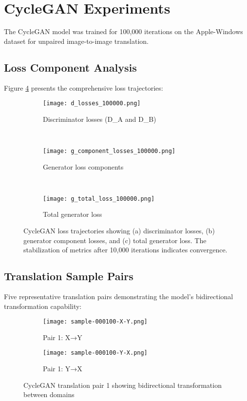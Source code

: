 \documentclass{article}
\begin{document}
\section{CycleGAN Experiments}
The CycleGAN model was trained for 100,000 iterations on the Apple-Windows dataset for unpaired image-to-image translation.

\subsection{Loss Component Analysis}
Figure \ref{fig:cyclegan_losses} presents the comprehensive loss trajectories:

\begin{figure}[H]
\centering
\begin{subfigure}{0.8\textwidth}
    \texttt{[image: d\_losses\_100000.png]}
    \caption{Discriminator losses (D\_A and D\_B)}
    \label{fig:cyclegan_d_loss}
\end{subfigure}
\\
\begin{subfigure}{0.8\textwidth}
    \texttt{[image: g\_component\_losses\_100000.png]}
    \caption{Generator loss components}
    \label{fig:cyclegan_g_components}
\end{subfigure}
\\
\begin{subfigure}{0.8\textwidth}
    \texttt{[image: g\_total\_loss\_100000.png]}
    \caption{Total generator loss}
    \label{fig:cyclegan_g_total}
\end{subfigure}
\caption{CycleGAN loss trajectories showing (a) discriminator losses, (b) generator component losses, and (c) total generator loss. The stabilization of metrics after 10,000 iterations indicates convergence.}
\label{fig:cyclegan_losses}
\end{figure}

\subsection{Translation Sample Pairs}
Five representative translation pairs demonstrating the model's bidirectional transformation capability:

\begin{figure}[H]
\centering
\begin{subfigure}{0.45\textwidth}
    \texttt{[image: sample-000100-X-Y.png]}
    \caption{Pair 1: X→Y}
    \label{fig:cyclegan_pair1_XY}
\end{subfigure}
\hfill
\begin{subfigure}{0.45\textwidth}
    \texttt{[image: sample-000100-Y-X.png]}
    \caption{Pair 1: Y→X}
    \label{fig:cyclegan_pair1_YX}
\end{subfigure}
\caption{CycleGAN translation pair 1 showing bidirectional transformation between domains}
\label{fig:cyclegan_pair1}
\end{figure}
\end{document}
